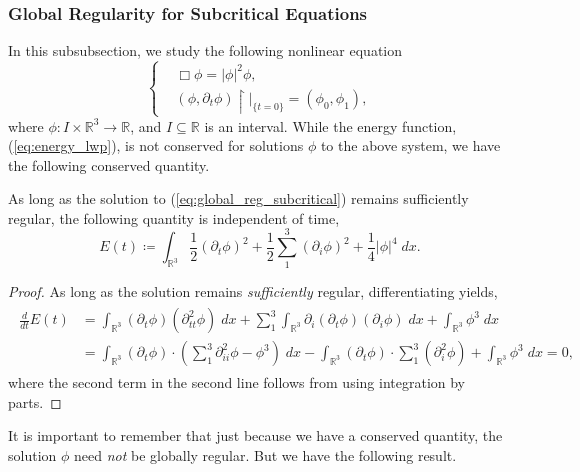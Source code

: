 \documentclass{article}
\begin{document}
\subsubsection{Global Regularity for Subcritical Equations} 
In this subsubsection, we study the following nonlinear equation 
\begin{equation}
	\left\{
	\begin{alignedat}{1}
		&\Box\phi = |\phi|^{2}\phi, \\
		&(\phi,\partial_{t}\phi)\upharpoonright|_{\{t = 0\}} = (\phi_{0}, \phi_{1}), 
	\end{alignedat} 
	\right. 
	\label{eq:global_reg_subcritical}
\end{equation}
where $\phi: I \times \mathbb{R}^{3} \to \mathbb{R}$, and $I \subseteq \mathbb{R}$ is an interval. While the energy function, (\ref{eq:energy_lwp}), is not conserved for solutions $\phi$ to the above system, we have the following conserved quantity. 
\begin{prop}
	As long as the solution to (\ref{eq:global_reg_subcritical}) remains sufficiently regular, the following quantity is independent of time, 
	\begin{equation}
		E(t) \coloneqq \int_{\mathbb{R}^3}\frac{1}{2}(\partial_{t}\phi)^{2} + \frac{1}{2}\sum_{1}^{3}(\partial_{i}\phi)^{2} + \frac{1}{4}|\phi|^{4}\;dx. 
		\label{eq:conserved_energy_subcritical}
	\end{equation} 
\end{prop} 
\begin{proof}
	As long as the solution remains \textit{sufficiently} regular, differentiating yields, 
	\begin{align*}
		\begin{split}
			\frac{d}{dt}E(t) &= \int_{\mathbb{R}^{3}}(\partial_{t}\phi)(\partial_{tt}^{2}\phi)\;dx + \sum_{1}^{3}\int_{\mathbb{R}^{3}}\partial_{i}(\partial_{t}\phi)(\partial_{i}\phi)\;dx  + \int_{\mathbb{R}^{3}}\phi^{3}\;dx  \\
			&= \int_{\mathbb{R}^{3}}(\partial_{t}\phi)\cdot \left(\sum_{1}^{3}\partial^{2}_{ii}\phi - \phi^{3}\right)\;dx - \int_{\mathbb{R}^{3}}(\partial_{t}\phi) \cdot \sum_{1}^{3}(\partial_{i}^{2}\phi) + \int_{\mathbb{R}^{3}}\phi^{3}\;dx = 0, 
		\end{split} 
	\end{align*} 
	where the second term in the second line follows from using integration by parts. 
\end{proof} 
It is important to remember that just because we have a conserved quantity, the solution $\phi$ need \textit{not} be globally regular. But we have the following result. 
\end{document}
